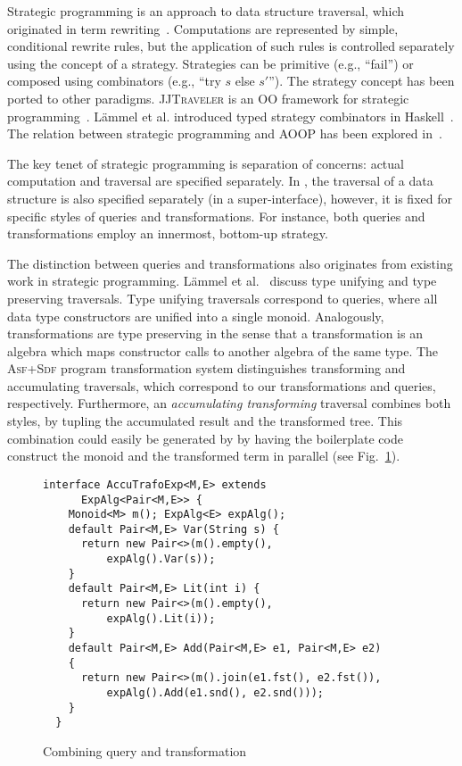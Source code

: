Strategic programming is an approach to data structure traversal,
which originated in term
rewriting~\cite{borovansky1996elan,visser1998core,vandenBrand:2003:TRT:941566.941568}.
Computations are represented by simple, conditional rewrite rules, but
the application of such rules is controlled separately using the
concept of a strategy.  Strategies can be primitive (e.g., ``fail'')
or composed using combinators (e.g., ``try $s$ else $s'$'').  The
strategy concept has been ported to other paradigms.
\textsc{JJTraveler} is an OO framework for strategic
programming~\cite{visser01visitor}.  L\"ammel et al. introduced typed
strategy combinators in Haskell~\cite{lammel2002typed}.  The relation
between strategic programming and AOOP has been explored
in~\cite{lammel2003strategic}.

The key tenet of strategic programming is separation of concerns:  actual computation and traversal are specified separately.
In \name, the traversal of a data structure is also specified separately (in a super-interface), however, it is fixed for specific styles of queries and transformations.
For instance, both queries and transformations employ an innermost, bottom-up strategy.

The distinction between queries and transformations also originates from existing work in strategic programming.
L\"ammel et al.~\cite{lammel2002typed} discuss type unifying and type preserving traversals.
Type unifying traversals correspond to queries, where all data type constructors are unified into a single monoid.
Analogously, \name transformations are type preserving in the sense that a transformation is an algebra which maps constructor calls to another algebra of the same type.
The \textsc{Asf+Sdf} program transformation system distinguishes transforming and accumulating traversals, which correspond to our transformations and queries, respectively.
Furthermore, an \textit{accumulating transforming} traversal combines both styles, by tupling the accumulated result and the transformed tree.
This combination could easily be generated by \name by having the boilerplate code construct the monoid and the transformed term in parallel (see Fig.~\ref{FIG:accuTrafo}).

\begin{figure}[t]
\nocaptionrule
\begin{lstlisting}[mathescape=true]
  interface AccuTrafoExp<M,E> extends
      ExpAlg<Pair<M,E>> {
    Monoid<M> m(); ExpAlg<E> expAlg();
    default Pair<M,E> Var(String s) {
      return new Pair<>(m().empty(),
          expAlg().Var(s));
    }
    default Pair<M,E> Lit(int i) {
      return new Pair<>(m().empty(),
          expAlg().Lit(i));
    }
    default Pair<M,E> Add(Pair<M,E> e1, Pair<M,E> e2)
    {
      return new Pair<>(m().join(e1.fst(), e2.fst()),
          expAlg().Add(e1.snd(), e2.snd()));
    }
  }
\end{lstlisting}
\caption{Combining query and transformation}
\label{FIG:accuTrafo}
\end{figure}

